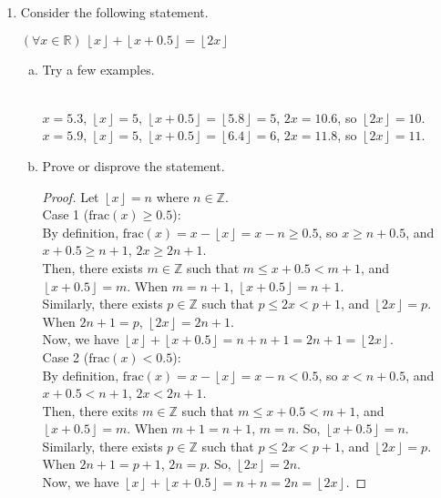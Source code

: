 \documentclass[12pt]{amsart}
\newcommand{\floor}[1]{\ensuremath{\left\lfloor #1\right\rfloor}}
\begin{document}
\begin{enumerate}[{\bfseries 1.}]
\newpage
\item Consider the following statement.

	\vspace{0.1in}
	\begin{center}
	\noindent
	\textit{$(\forall x\in\mathbb{R})\ \floor{x}+\floor{x+0.5}=\floor{2x}$}
	\end{center}

	\begin{enumerate}[(a)]
	\vspace{0.1in}
	\item Try a few examples.
	\begin{normalize}
	\vspace{0.1in}
	\\$x = 5.3$, $\floor{x} = 5$, $\floor{x+ 0.5} = \floor{5.8} = 5$, $2x = 10.6$, so $\floor{2x} = 10$.
	\\$x = 5.9$, $\floor{x} = 5$, $\floor{x+ 0.5} = \floor{6.4} = 6$, $2x = 11.8$, so $\floor{2x} = 11$.
	\\
	\end{normalize}
	\item Prove or disprove the statement.
	\begin{normalize}
	\vspace{0.1in}
    	\begin{proof}
    	Let $\floor{x} = n$ where $n \in\mathbb{Z}$. 
    	\\Case 1 ($\text{frac}(x) \geq 0.5$):
    	\\By definition, $\text{frac}(x) = x - \floor{x} = x - n \geq 0.5 $, so $x \geq n +0.5$, and $x+0.5 \geq n+1$, $2x \geq 2n + 1$.
    	\\Then, there exists $m\in\mathbb{Z}$ such that $m \leq x +0.5 < m +1$, and $\floor{x+0.5} = m$. When $m = n+1$, $\floor{x+0.5} = n+1$. 
    	\\Similarly, there exists $p\in\mathbb{Z}$ such that $p \leq 2x < p+1$, and $\floor{2x} = p$. When $2n+1 = p$, $\floor{2x} = 2n+1$.
    	\\Now, we have $\floor{x} + \floor{x+0.5} = n + n + 1 = 2n + 1 = \floor{2x}$.
    	\\Case 2 ($\text{frac}(x) < 0.5$):
    	\\By definition, $\text{frac}(x) = x - \floor{x} = x - n < 0.5 $, so $x < n +0.5$, and $x+0.5 < n+1$, $2x < 2n + 1$.
    	\\Then, there exits $m\in\mathbb{Z}$ such that $m \leq x +0.5 < m +1$, and $\floor{x+0.5} = m$. When $m+1 = n + 1$, $m = n$. So, $\floor{x+0.5} = n$.
    	\\Similarly, there exists $p\in\mathbb{Z}$ such that $p \leq 2x < p+1$, and $\floor{2x} = p$. When $2n+1 = p + 1$, $2n = p$. So, $\floor{2x} = 2n$. 
    	\\Now, we have $\floor{x} + \floor{x+0.5} = n + n= 2n = \floor{2x}$.
    	\end{proof}
	\end{normalize}
	\vfill
	\vfill
	\vfill
	\vfill
	\end{enumerate}


\end{enumerate}
\end{document}
